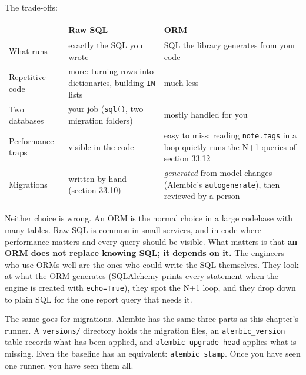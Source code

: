 \noindent{}The trade-offs:


{\def\LTcaptype{none} %
\begin{longtable}[]{@{}
  >{\raggedright\arraybackslash}p{}
  >{\raggedright\arraybackslash}p{}
  >{\raggedright\arraybackslash}p{}@{}}
\toprule\noalign{}
\begin{minipage}[b]{\linewidth}\raggedright
\end{minipage} & \begin{minipage}[b]{\linewidth}\raggedright
Raw SQL
\end{minipage} & \begin{minipage}[b]{\linewidth}\raggedright
ORM
\end{minipage} \\
\midrule\noalign{}
\endhead
\bottomrule\noalign{}
\endlastfoot
What runs & exactly the SQL you wrote & SQL the library generates from your code \\
Repetitive code & more: turning rows into dictionaries, building \texttt{IN} lists & much less \\
Two databases & your job (\texttt{sql()}, two migration folders) & mostly handled for you \\
Performance traps & visible in the code & easy to miss: reading \texttt{note.tags} in a loop quietly runs the N+1 queries of section 33.12 \\
Migrations & written by hand (section 33.10) & \emph{generated} from model changes (Alembic's \texttt{autogenerate}), then reviewed by a person \\
\end{longtable}
}

Neither choice is wrong. An ORM is the normal choice in a large codebase with many tables. Raw SQL is common in small services, and in code where performance matters and every query should be visible. What matters is that \textbf{an ORM does not replace knowing SQL; it depends on it.} The engineers who use ORMs well are the ones who could write the SQL themselves. They look at what the ORM generates (SQLAlchemy prints every statement when the engine is created with \texttt{echo=True}), they spot the N+1 loop, and they drop down to plain SQL for the one report query that needs it.

The same goes for migrations. Alembic has the same three parts as this chapter's runner. A \texttt{versions/} directory holds the migration files, an \texttt{alembic\_version} table records what has been applied, and \texttt{alembic\ upgrade\ head} applies what is missing. Even the baseline has an equivalent: \texttt{alembic\ stamp}. Once you have seen one runner, you have seen them all.

